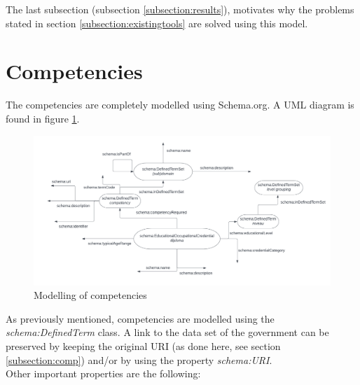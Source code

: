 \documentclass[a4paper]{report}
\begin{document}
    The last subsection (subsection \ref{subsection:results}), motivates why the problems stated in section \ref{subsection:existingtools} are solved using this model.

    \section{Competencies}
    \label{subsection:compmodel}

    The competencies are completely modelled using Schema.org. A UML diagram is found in figure \ref{fig:uml-comp}.\\

    \begin{figure}[h]
    \caption{Modelling of competencies}
    \label{fig:uml-comp}
    \includegraphics[scale=0.5]{uml-competencies.png}
    \end{figure}
    \noindent As previously mentioned, competencies are modelled using the \textit{schema:DefinedTerm} class.
    A link to the data set of the government can be preserved by keeping the original URI (as done here, see section \ref{subsection:comp}) and/or by using the property \textit{schema:URI}. \\
    Other important properties are the following:
\end{document}
